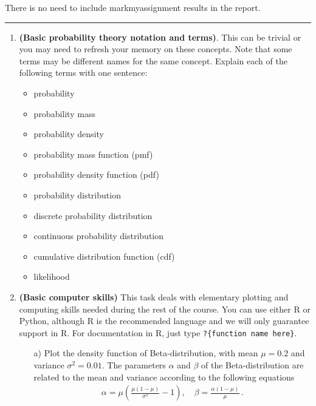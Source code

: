 \documentclass[11pt,a4paper,english]{article}\usepackage[]{graphicx}\usepackage[]{xcolor}
\newcommand{\HRule}{\rule{\linewidth}{0.5mm}}
\begin{document}
There is no need to include markmyassignment results in the report.

\HRule

\newpage

\begin{enumerate}

\item {\bf (Basic probability theory notation and terms)}. This can be trivial or you may need to refresh your memory on these concepts. Note that some terms may be different names for the same concept. Explain each of the following terms with one sentence:
  \begin{itemize}
    \item probability
    \item probability mass
    \item probability density
    \item probability mass function (pmf)
    \item probability density function (pdf)
    \item probability distribution
    \item discrete probability distribution
    \item continuous probability distribution
    \item cumulative distribution function (cdf)
    \item likelihood
  \end{itemize}

\item {\bf (Basic computer skills)} This task deals with elementary plotting and computing skills needed during the rest of the course. You can use either R or Python, although R is the recommended language and we will only guarantee support in R. For documentation in R, just type \texttt{?\{function name here\}}.
\begin{itemize}
    \item[a)] Plot the density function of Beta-distribution, with mean $\mu = 0.2$ and variance $\sigma^2=0.01$. The parameters $\alpha$ and $\beta$ of the Beta-distribution are related to the mean and variance according to the following equations
    \begin{align*}
    \alpha = \mu \left( \frac{\mu(1-\mu)}{\sigma^2} - 1 \right), \quad
    \beta = \frac{\alpha (1-\mu) }{\mu} \,.
\end{align*}


\end{itemize}
\end{enumerate}
\end{document}
